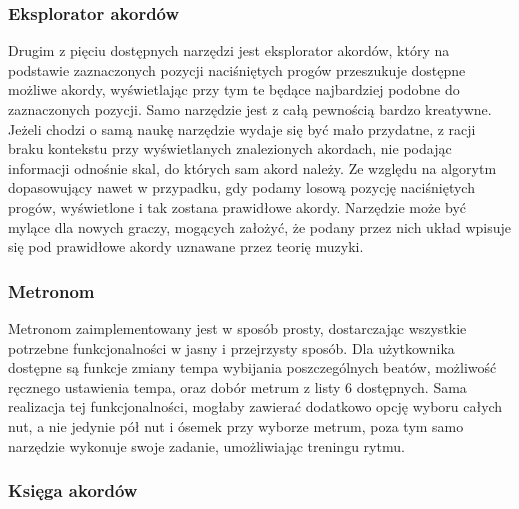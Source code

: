 \subsubsection{Eksplorator akordów}

Drugim z pięciu dostępnych narzędzi jest eksplorator akordów, który na podstawie zaznaczonych pozycji naciśniętych progów przeszukuje dostępne możliwe akordy, wyświetlając przy tym te będące najbardziej podobne do zaznaczonych pozycji. Samo narzędzie jest z całą pewnością bardzo kreatywne. Jeżeli chodzi o samą naukę narzędzie wydaje się być mało przydatne, z racji braku kontekstu przy wyświetlanych znalezionych akordach, nie podając informacji odnośnie skal, do których sam akord należy. Ze względu na algorytm dopasowujący nawet w przypadku, gdy podamy losową pozycję naciśniętych progów, wyświetlone i tak zostana prawidłowe akordy. Narzędzie może być mylące dla nowych graczy, mogących założyć, że podany przez nich układ wpisuje się pod prawidłowe akordy uznawane przez teorię muzyki.

\subsubsection{Metronom}

Metronom zaimplementowany jest w sposób prosty, dostarczając wszystkie potrzebne funkcjonalności w jasny i przejrzysty sposób. Dla użytkownika dostępne są funkcje zmiany tempa wybijania poszczególnych beatów, możliwość ręcznego ustawienia tempa, oraz dobór metrum z listy 6 dostępnych. Sama realizacja tej funkcjonalności, mogłaby zawierać dodatkowo opcję wyboru całych nut, a nie jedynie pół nut i ósemek przy wyborze metrum, poza tym samo narzędzie wykonuje swoje zadanie, umożliwiając treningu rytmu.

\subsubsection{Księga akordów}

